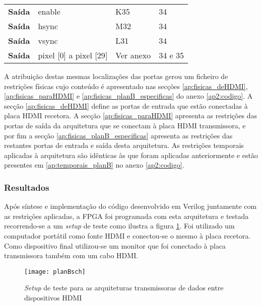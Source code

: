 \begin{table}[h!]
\begin{tabular}{rlll}
			\multicolumn{1}{r|}{\textbf{Saída}}   & enable                                & K35                                      & 34                                         \\
			\multicolumn{1}{r|}{\textbf{Saída}}   & hsync                                 & M32                                      & 34                                         \\
			\multicolumn{1}{r|}{\textbf{Saída}}   & vsync                                 & L31                                      & 34                                         \\
			\multicolumn{1}{r|}{\textbf{Saída}}   & pixel {[}0{]} a pixel {[}29{]}        & Ver anexo                                & 34 e 35                                    \\ \hline
		\end{tabular}%
\end{table}



A atribuição destas mesmas localizações das portas gerou um ficheiro de restrições físicas cujo conteúdo é apresentado nas secções \ref{ap:fisicas_deHDMI}, \ref{ap:fisicas_paraHDMI} e \ref{ap:fisicas_planB_especificas} do anexo \ref{ap2:codigo}. A secção \ref{ap:fisicas_deHDMI} define as portas de entrada que estão conectadas à placa HDMI recetora. A secção \ref{ap:fisicas_paraHDMI} apresenta as restrições das portas de saída da arquitetura que se conectam à placa HDMI transmissora, e por fim a secção \ref{ap:fisicas_planB_especificas} apresenta as restrições das restantes portas de entrada e saída desta arquitetura. As restrições temporais aplicadas à arquitetura são idênticas às que foram aplicadas anteriormente e estão presentes em \ref{ap:temporais_planB} no anexo \ref{ap2:codigo}.

\subsubsection*{Resultados}
Após síntese e implementação do código desenvolvido em Verilog juntamente com as restrições aplicadas, a FPGA foi programada com esta arquitetura e testada recorrendo-se a um \textit{setup} de teste como ilustra a figura \ref{fig:planb_sch}. Foi utilizado um computador portátil como fonte HDMI e conectou-se o mesmo à placa recetora. Como dispositivo final utilizou-se um monitor que foi conectado à placa transmissora também com um cabo HDMI. 

\begin{figure}[h!]
	\begin{center}
		\leavevmode
		\texttt{[image: planBsch]}
		\caption{\textit{Setup} de teste para as arquiteturas transmissoras de dados entre dispositivos HDMI}
		\label{fig:planb_sch}
	\end{center}
\end{figure}


